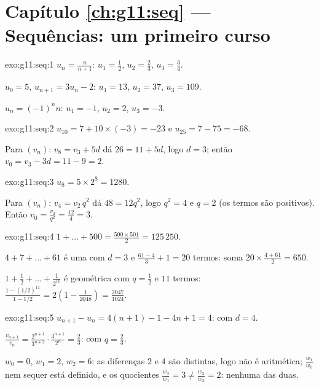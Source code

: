 \section*{Capítulo \ref{ch:g11:seq} --- Sequências: um primeiro curso}

\begin{solution}{exo:g11:seq:1}
$u_n = \frac{n}{n+1}$: $u_1 = \frac12$, $u_2 = \frac23$,
$u_3 = \frac34$.

$u_0 = 5$, $u_{n+1} = 3u_n - 2$: $u_1 = 13$, $u_2 = 37$, $u_3 = 109$.

$u_n = (-1)^n n$: $u_1 = -1$, $u_2 = 2$, $u_3 = -3$.
\end{solution}

\begin{solution}{exo:g11:seq:2}
$u_{10} = 7 + 10 \times (-3) = -23$ e $u_{25} = 7 - 75 = -68$.

Para $(v_n)$: $v_8 = v_3 + 5d$ dá $26 = 11 + 5d$, logo $d = 3$; então
$v_0 = v_3 - 3d = 11 - 9 = 2$.
\end{solution}

\begin{solution}{exo:g11:seq:3}
$u_8 = 5 \times 2^8 = 1280$.

Para $(v_n)$: $v_4 = v_2\, q^2$ dá $48 = 12 q^2$, logo $q^2 = 4$ e
$q = 2$ (os termos são positivos). Então
$v_0 = \frac{v_2}{q^2} = \frac{12}{4} = 3$.
\end{solution}

\begin{solution}{exo:g11:seq:4}
$1 + \dots + 500 = \frac{500 \times 501}{2} = 125\,250$.

$4 + 7 + \dots + 61$ é uma  com $d = 3$ e
$\frac{61 - 4}{3} + 1 = 20$ termos: soma
$20 \times \frac{4 + 61}{2} = 650$.

$1 + \frac12 + \dots + \frac{1}{2^{10}}$ é geométrica com
$q = \frac12$ e $11$ termos:
$\frac{1 - (1/2)^{11}}{1 - 1/2} = 2\left(1 - \frac{1}{2048}\right)
= \frac{2047}{1024}$.
\end{solution}

\begin{solution}{exo:g11:seq:5}
$u_{n+1} - u_n = 4(n+1) - 1 - 4n + 1 = 4$:  com
$d = 4$.

$\frac{v_{n+1}}{v_n} = \frac{2^{n+1}}{3^{n+2}} \cdot \frac{3^{n+1}}{2^n}
= \frac23$:  com $q = \frac23$.

$w_0 = 0$, $w_1 = 2$, $w_2 = 6$: as diferenças $2$ e $4$ são distintas,
logo não é aritmética; $\frac{w_1}{w_0}$ nem sequer está definido, e os
quocientes $\frac{w_2}{w_1} = 3 \neq \frac{w_3}{w_2} = 2$: nenhuma das
duas.
\end{solution}

